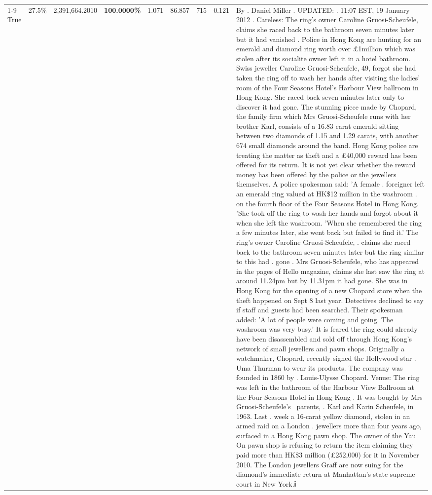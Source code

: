 \begin{table}[H]
\begin{tabular}{lllrlllll}
\cline{1-9} \cline{2-9}
True & 27.5\% & 2,391,664.2010 & \bfseries \color{red} 100.0000\% & 1.071 & 86.857 & 715 & 0.121 & By . Daniel Miller . UPDATED: . 11:07 EST, 19 January 2012 . Careless: The ring's owner Caroline Gruosi-Scheufele, claims she raced back to the bathroom seven minutes later but it had vanished . Police in Hong Kong are hunting for an emerald and diamond ring worth over £1million which was stolen after its socialite owner left it in a hotel bathroom. Swiss jeweller Caroline Gruosi-Scheufele, 49, forgot she had taken the ring off to wash her hands after visiting the ladies' room of the Four Seasons Hotel's Harbour View ballroom in Hong Kong. She raced back seven minutes later only to discover it had gone. The stunning piece made by Chopard, the family firm which Mrs Gruosi-Scheufele runs with her brother Karl, consists of a 16.83 carat emerald sitting between two diamonds of 1.15 and 1.29 carats, with another 674 small diamonds around the band. Hong Kong police are treating the matter as theft and a £40,000 reward has been offered for its return. It is not yet clear whether the reward money has been offered by the police or the jewellers themselves. A police spokesman said: 'A female . foreigner left an emerald ring valued at HK\$12 million in the washroom . on the fourth floor of the Four Seasons Hotel in Hong Kong. 'She took off the ring to wash her hands and forgot about it when she left the washroom. 'When she remembered the ring a few minutes later, she went back but failed to find it.' The ring's owner Caroline Gruosi-Scheufele, . claims she raced back to the bathroom seven minutes later but the ring similar to this had . gone . Mrs Gruosi-Scheufele, who has appeared in the pages of Hello magazine, claims she last saw the ring at around 11.24pm but by 11.31pm it had gone. She was in Hong Kong for the opening of a new Chopard store when the theft happened on Sept 8 last year. Detectives declined to say if staff and guests had been searched. Their spokesman added: 'A lot of people were coming and going. The washroom was very busy.' It is feared the ring could already have been disassembled and sold off through Hong Kong's network of small jewellers and pawn shops. Originally a watchmaker, Chopard, recently signed the Hollywood star . Uma Thurman to wear its products. The company was founded in 1860 by . Louis-Ulysse Chopard. Venue: The ring was left in the bathroom of the Harbour View Ballroom at the Four Seasons Hotel in Hong Kong . It was bought by Mrs Gruosi-Scheufele's  parents, . Karl and Karin Scheufele, in 1963. Last . week a 16-carat yellow diamond, stolen in an armed raid on a London . jewellers more than four years ago, surfaced in a Hong Kong pawn shop. The owner of the Yau On pawn shop is refusing to return the item claiming they paid more than HK\$3 million (£252,000) for it in November 2010. The London jewellers Graff are now suing for the diamond’s immediate return at Manhattan’s state supreme court in New York.𝐢 \\

\end{tabular}
\end{table}
